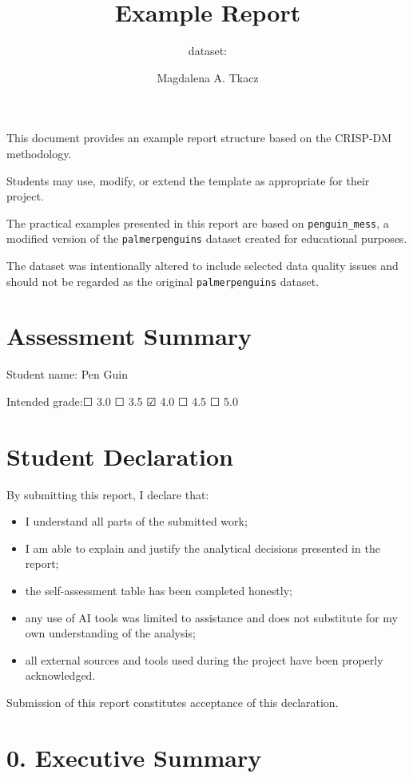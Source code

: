 \documentclass[
]{article}
\title{Example Report}
\subtitle{dataset:}
\author{Magdalena A. Tkacz}
\date{}
\providecommand{\tightlist}{%
  \setlength{\itemsep}{0pt}\setlength{\parskip}{0pt}}
\begin{document}
\maketitle

{
\setcounter{tocdepth}{3}
\tableofcontents
}
This document provides an example report structure based on the CRISP-DM
methodology.

Students may use, modify, or extend the template as appropriate for
their project.

The practical examples presented in this report are based on
\texttt{penguin\_mess}, a modified version of the
\texttt{palmerpenguins} dataset created for educational purposes.

The dataset was intentionally altered to include selected data quality
issues and should not be regarded as the original
\texttt{palmerpenguins} dataset.

\section{Assessment Summary}\label{assessment-summary}

Student name: Pen Guin

Intended grade:☐ 3.0 ☐ 3.5 ☑ 4.0 ☐ 4.5 ☐ 5.0

\section{Student Declaration}\label{student-declaration}

By submitting this report, I declare that:

\begin{itemize}
\tightlist
\item
  I understand all parts of the submitted work;
\item
  I am able to explain and justify the analytical decisions presented in
  the report;
\item
  the self-assessment table has been completed honestly;
\item
  any use of AI tools was limited to assistance and does not substitute
  for my own understanding of the analysis;
\item
  all external sources and tools used during the project have been
  properly acknowledged.
\end{itemize}

Submission of this report constitutes acceptance of this declaration.

\section{0. Executive Summary}\label{executive-summary}
\end{document}
